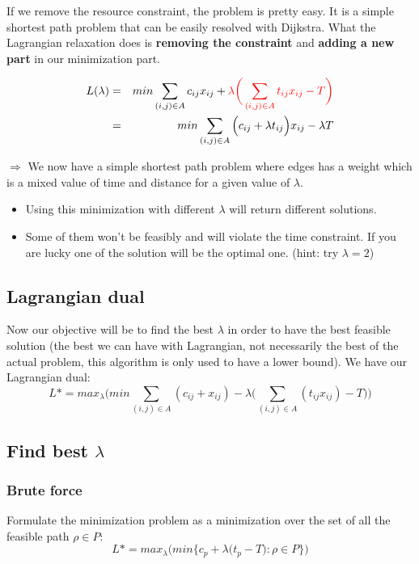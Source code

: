If we remove the resource constraint, the problem is pretty easy. It is
a simple shortest path problem that can be easily resolved with
Dijkstra. What the Lagrangian relaxation does is \textbf{removing the
constraint} and \textbf{adding a new part} in our minimization part.

\begin{eqnarray*}
    L(\lambda) &=& min \sum_{(i,j)\in A} c_{ij} x_{ij} + 
    \textcolor{red}{\lambda \bigg(\sum_{(i,j)\in A} t_{ij} x_{ij} - T
    \bigg)} \\
    &=& min \sum_{(i,j)\in A} \Big(c_{ij} + \lambda t_{ij}\Big) x_{ij} - \lambda T\\
\end{eqnarray*}

$\Rightarrow$ We now have a simple shortest path problem 
where edges has a weight which is a
mixed value of time and distance for a given value of $\lambda$. 

\begin{itemize}
    \item Using this minimization with different $\lambda$ will return
        different solutions. 

    \item Some of them won't be feasibly and will violate the time
        constraint. If you are lucky one of the solution will be the
        optimal one. (hint: try $\lambda = 2$)
\end{itemize}

\subsection{Lagrangian dual}
Now our objective will be to find the best $\lambda$ in order to have
the best feasible solution (the best we can have with Lagrangian, not
necessarily the best of the actual problem, this algorithm is only used
to have a lower bound). We have our Lagrangian dual: 
$$L* = max_{\lambda} \Bigg( min \sum_{(i,j)\in A} (c_{ij} + x_{ij}) -
\lambda \big(\sum_{(i,j)\in A} (t_{ij} x_{ij}) - T\big) \Bigg)$$


\subsection{Find best $\lambda$}

\subsubsection{Brute force}
Formulate the minimization problem as a minimization over the set of all 
the feasible path $\rho \in P$:
$$L* = max_{\lambda} \Bigg( min \{ c_{p} + \lambda\big(t_p - T): \rho
    \in P \}\Bigg)$$

